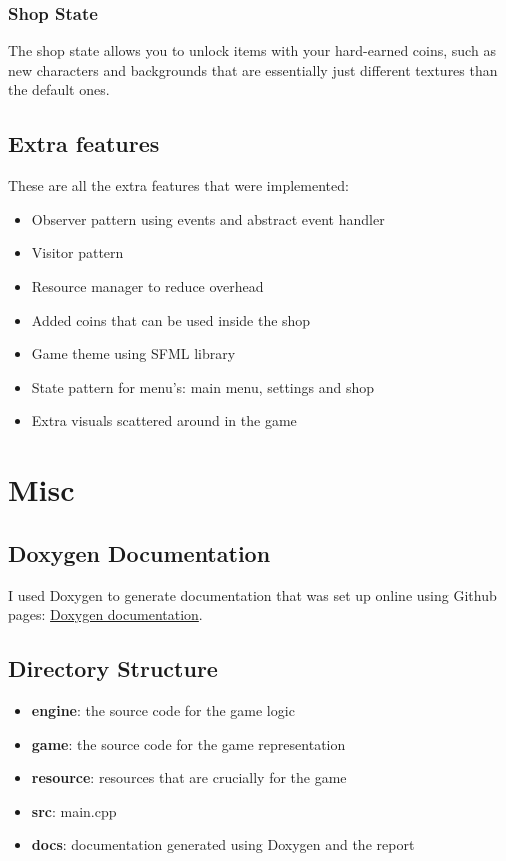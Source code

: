 \documentclass{report}
\begin{document}
\subsection{Shop State}
The shop state allows you to unlock items with your hard-earned coins, such as new characters and backgrounds that are essentially just different textures than the default ones.

\section{Extra features}
These are all the extra features that were implemented:
\begin{itemize}
\item Observer pattern using events and abstract event handler
\item Visitor pattern
\item Resource manager to reduce overhead
\item Added coins that can be used inside the shop
\item Game theme using SFML library
\item State pattern for menu's: main menu, settings and shop
\item Extra visuals scattered around in the game
\end{itemize}

\chapter*{Misc}

\section{Doxygen Documentation}
I used Doxygen to generate documentation that was set up online using Github pages: \href{https://pablodeputter.github.io/Advanced-Programming-DoodleJump}{Doxygen documentation}.

\section{Directory Structure}
\begin{itemize}
\item \textbf{engine}: the source code for the game logic
\item \textbf{game}: the source code for the game representation
\item \textbf{resource}: resources that are crucially for the game
\item \textbf{src}: main.cpp
\item \textbf{docs}: documentation generated using Doxygen and the report
\end{itemize}
\end{document}
